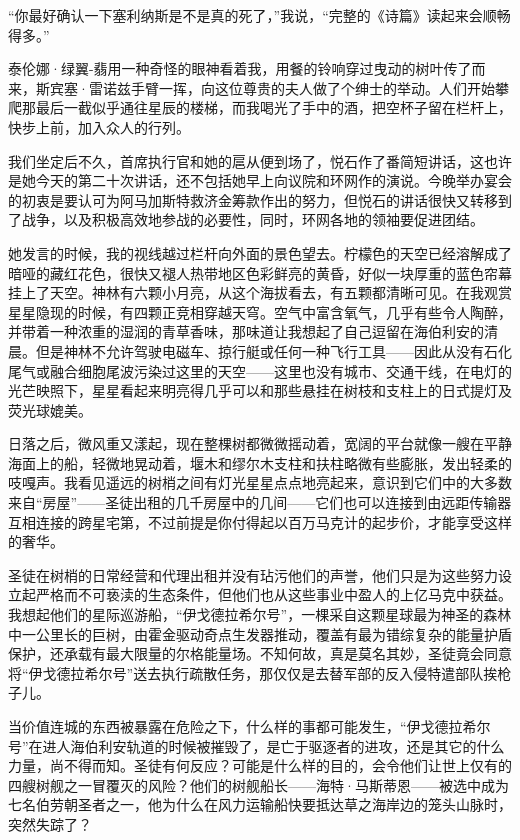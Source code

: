 \documentclass[AutoFakeBold=true]{book}
\begin{document}
``你最好确认一下塞利纳斯是不是真的死了，''我说，``完整的《诗篇》读起来会顺畅得多。''

泰伦娜·绿翼-翡用一种奇怪的眼神看着我，用餐的铃响穿过曳动的树叶传了而来，斯宾塞·雷诺兹手臂一挥，向这位{\kaishu 尊贵的夫人}做了个绅士的举动。人们开始攀爬那最后一截似乎通往星辰的楼梯，而我喝光了手中的酒，把空杯子留在栏杆上，快步上前，加入众人的行列。

我们坐定后不久，首席执行官和她的扈从便到场了，悦石作了番简短讲话，这也许是她今天的第二十次讲话，还不包括她早上向议院和环网作的演说。今晚举办宴会的初衷是要认可为阿马加斯特救济金筹款作出的努力，但悦石的讲话很快又转移到了战争，以及积极高效地参战的必要性，同时，环网各地的领袖要促进团结。

她发言的时候，我的视线越过栏杆向外面的景色望去。柠檬色的天空已经溶解成了暗哑的藏红花色，很快又褪人热带地区色彩鲜亮的黄昏，好似一块厚重的蓝色帘幕挂上了天空。神林有六颗小月亮，从这个海拔看去，有五颗都清晰可见。在我观赏星星隐现的时候，有四颗正竞相穿越天穹。空气中富含氧气，几乎有些令人陶醉，并带着一种浓重的湿润的青草香味，那味道让我想起了自己逗留在海伯利安的清晨。但是神林不允许驾驶电磁车、掠行艇或任何一种飞行工具——因此从没有石化尾气或融合细胞尾波污染过这里的天空——这里也没有城市、交通干线，在电灯的光芒映照下，星星看起来明亮得几乎可以和那些悬挂在树枝和支柱上的日式提灯及荧光球媲美。

日落之后，微风重又漾起，现在整棵树都微微摇动着，宽阔的平台就像一艘在平静海面上的船，轻微地晃动着，堰木和缪尔木支柱和扶柱略微有些膨胀，发出轻柔的吱嘎声。我看见遥远的树梢之间有灯光星星点点地亮起来，意识到它们中的大多数来自``房屋''——圣徒出租的几千房屋中的几间——它们也可以连接到由远距传输器互相连接的跨星宅第，不过前提是你付得起以百万马克计的起步价，才能享受这样的奢华。

圣徒在树梢的日常经营和代理出租并没有玷污他们的声誉，他们只是为这些努力设立起严格而不可亵渎的生态条件，但他们也从这些事业中盈人的上亿马克中获益。我想起他们的星际巡游船，``伊戈德拉希尔号''，一棵采自这颗星球最为神圣的森林中一公里长的巨树，由霍金驱动奇点生发器推动，覆盖有最为错综复杂的能量护盾保护，还承载有最大限量的尔格能量场。不知何故，真是莫名其妙，圣徒竟会同意将``伊戈德拉希尔号''送去执行疏散任务，那仅仅是去替军部的反入侵特遣部队挨枪子儿。

当价值连城的东西被暴露在危险之下，什么样的事都可能发生，``伊戈德拉希尔号''在进人海伯利安轨道的时候被摧毁了，是亡于驱逐者的进攻，还是其它的什么力量，尚不得而知。圣徒有何反应？可能是什么样的目的，会令他们让世上仅有的四艘树舰之一冒覆灭的风险？他们的树舰船长——海特·马斯蒂恩——被选中成为七名伯劳朝圣者之一，他为什么在风力运输船快要抵达草之海岸边的笼头山脉时，突然失踪了？
\end{document}
